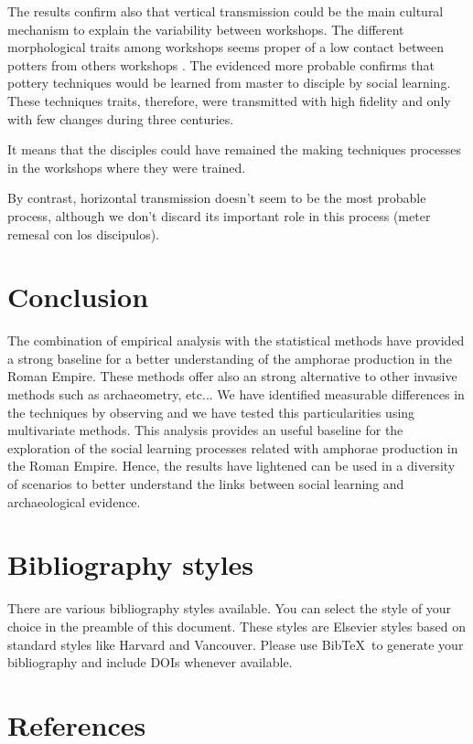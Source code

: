 \documentclass[review]{elsarticle}
\begin{document}
 



 The results confirm also that vertical transmission could be the main cultural mechanism to explain the variability between workshops. The different morphological traits among workshops seems proper of a low contact between potters from others workshops . The evidenced more probable confirms that pottery techniques would be learned from master to disciple by social learning. These techniques traits, therefore, were transmitted with high fidelity and only with few changes during three centuries. 
 
 
 
 It means that the disciples could have remained the making techniques processes in the workshops where they were trained.  

 



By contrast, horizontal transmission doesn't seem to be the most probable process, although we don't discard its important role in this process (meter remesal con los discipulos). 


\section{Conclusion}
The combination of empirical analysis with the statistical methods have provided a strong baseline for a better understanding of the amphorae production in the Roman Empire. These methods offer also an strong alternative to other invasive methods  such as archaeometry, etc... We have identified measurable differences in the techniques by observing and we have tested this particularities using multivariate methods. This analysis provides an useful baseline for the exploration of the social learning processes related with amphorae production in the Roman Empire. Hence, the results have lightened can be used in a diversity of scenarios to better understand the links between social learning and archaeological evidence.





\section{Bibliography styles}

There are various bibliography styles available. You can select the style of your choice in the preamble of this document. These styles are Elsevier styles based on standard styles like Harvard and Vancouver. Please use Bib\TeX\ to generate your bibliography and include DOIs whenever available.

\section*{References}

%

\end{document}
